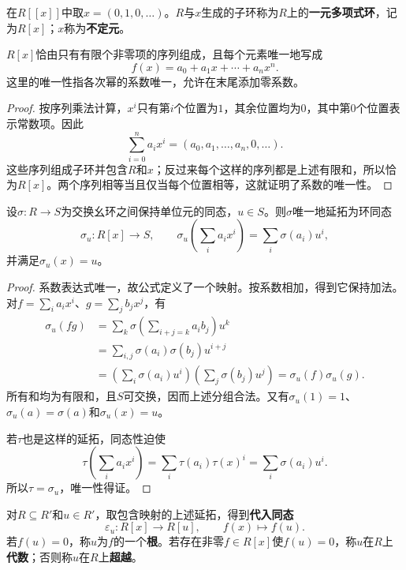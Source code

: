 \begin{definition}
在$R[[x]]$中取$x=(0,1,0,\ldots)$。$R$与$x$生成的子环称为$R$上的\textbf{一元多项式环}，记为$R[x]$；$x$称为\textbf{不定元}。
\end{definition}

\begin{proposition}
$R[x]$恰由只有有限个非零项的序列组成，且每个元素唯一地写成
\[
f(x)=a_0+a_1x+\cdots+a_nx^n.
\]
这里的唯一性指各次幂的系数唯一，允许在末尾添加零系数。
\end{proposition}
\begin{proof}
按序列乘法计算，$x^i$只有第$i$个位置为$1$，其余位置均为$0$，其中第$0$个位置表示常数项。因此
\[
\sum_{i=0}^n a_i x^i=(a_0,a_1,\ldots,a_n,0,\ldots).
\]
这些序列组成子环并包含$R$和$x$；反过来每个这样的序列都是上述有限和，所以恰为$R[x]$。两个序列相等当且仅当每个位置相等，这就证明了系数的唯一性。
\end{proof}

\begin{theorem}\label{p2:poly-universal}
设$\sigma:R\to S$为交换幺环之间保持单位元的同态，$u\in S$。则$\sigma$唯一地延拓为环同态
\[
\sigma_u:R[x]\to S,\qquad
\sigma_u\left(\sum_i a_i x^i\right)=\sum_i\sigma(a_i)u^i,
\]
并满足$\sigma_u(x)=u$。
\end{theorem}
\begin{proof}
系数表达式唯一，故公式定义了一个映射。按系数相加，得到它保持加法。对$f=\sum_i a_i x^i$、$g=\sum_j b_j x^j$，有
\begin{align*}
\sigma_u(fg)
&=\sum_k\sigma\left(\sum_{i+j=k}a_i b_j\right)u^k\\
&=\sum_{i,j}\sigma(a_i)\sigma(b_j)u^{i+j}\\
&=\left(\sum_i\sigma(a_i)u^i\right)
  \left(\sum_j\sigma(b_j)u^j\right)
=\sigma_u(f)\sigma_u(g).
\end{align*}
所有和均为有限和，且$S$可交换，因而上述分组合法。又有$\sigma_u(1)=1$、$\sigma_u(a)=\sigma(a)$和$\sigma_u(x)=u$。

若$\tau$也是这样的延拓，同态性迫使
\[
\tau\left(\sum_i a_i x^i\right)
=\sum_i\tau(a_i)\tau(x)^i
=\sum_i\sigma(a_i)u^i.
\]
所以$\tau=\sigma_u$，唯一性得证。
\end{proof}

\begin{definition}
对$R\subseteq R'$和$u\in R'$，取包含映射的上述延拓，得到\textbf{代入同态}
\[
\varepsilon_u:R[x]\to R[u],\qquad f(x)\longmapsto f(u).
\]
若$f(u)=0$，称$u$为$f$的一个\textbf{根}。若存在非零$f\in R[x]$使$f(u)=0$，称$u$在$R$上\textbf{代数}；否则称$u$在$R$上\textbf{超越}。
\end{definition}

